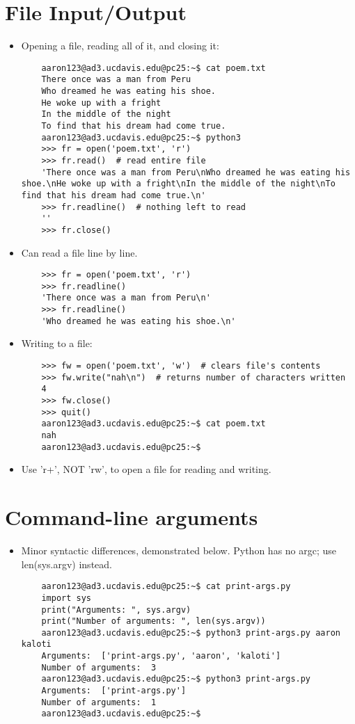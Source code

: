 \documentclass{article}
\begin{document}
\section{File Input/Output}
\begin{itemize}
    \item Opening a file, reading all of it, and closing it:
    \begin{lstlisting}
    aaron123@ad3.ucdavis.edu@pc25:~$ cat poem.txt 
    There once was a man from Peru
    Who dreamed he was eating his shoe.
    He woke up with a fright
    In the middle of the night
    To find that his dream had come true.
    aaron123@ad3.ucdavis.edu@pc25:~$ python3
    >>> fr = open('poem.txt', 'r')
    >>> fr.read()  # read entire file
    'There once was a man from Peru\nWho dreamed he was eating his shoe.\nHe woke up with a fright\nIn the middle of the night\nTo find that his dream had come true.\n'
    >>> fr.readline()  # nothing left to read
    ''
    >>> fr.close()
    \end{lstlisting}
    \item Can read a file line by line.
    \begin{lstlisting}
    >>> fr = open('poem.txt', 'r')
    >>> fr.readline()
    'There once was a man from Peru\n'
    >>> fr.readline()
    'Who dreamed he was eating his shoe.\n'
    \end{lstlisting}
    \item Writing to a file:
    \begin{lstlisting}
    >>> fw = open('poem.txt', 'w')  # clears file's contents
    >>> fw.write("nah\n")  # returns number of characters written
    4
    >>> fw.close()
    >>> quit()
    aaron123@ad3.ucdavis.edu@pc25:~$ cat poem.txt 
    nah
    aaron123@ad3.ucdavis.edu@pc25:~$ 
    \end{lstlisting}
    \item Use 'r+', NOT 'rw', to open a file for reading and writing.
\end{itemize}

\section{Command-line arguments}
\begin{itemize}
    \item Minor syntactic differences, demonstrated below. Python has no argc; use len(sys.argv) instead.
    \begin{lstlisting}
    aaron123@ad3.ucdavis.edu@pc25:~$ cat print-args.py 
    import sys
    print("Arguments: ", sys.argv)
    print("Number of arguments: ", len(sys.argv))
    aaron123@ad3.ucdavis.edu@pc25:~$ python3 print-args.py aaron kaloti
    Arguments:  ['print-args.py', 'aaron', 'kaloti']
    Number of arguments:  3
    aaron123@ad3.ucdavis.edu@pc25:~$ python3 print-args.py 
    Arguments:  ['print-args.py']
    Number of arguments:  1
    aaron123@ad3.ucdavis.edu@pc25:~$ 
    \end{lstlisting}
\end{itemize}
\end{document}
